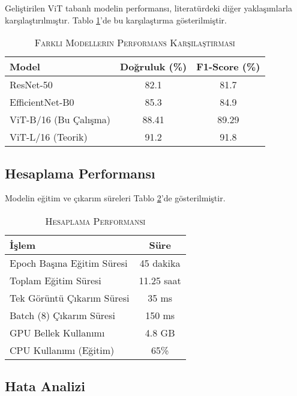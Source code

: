 \documentclass[conference, a4paper]{IEEEtran}
\begin{document}
	Geliştirilen ViT tabanlı modelin performansı, literatürdeki diğer yaklaşımlarla karşılaştırılmıştır. Tablo \ref{tablo_comparison}'de bu karşılaştırma gösterilmiştir.
	
	\begin{table}[h]
		\centering
		\caption{\textsc{Farklı Modellerin Performans Karşılaştırması}}
		\label{tablo_comparison}
		\begin{tabular}{|l|c|c|}
			\hline
			\textbf{Model} & \textbf{Doğruluk (\%)} & \textbf{F1-Score (\%)} \\
			\hline
			ResNet-50 & 82.1 & 81.7 \\
			\hline
			EfficientNet-B0 & 85.3 & 84.9 \\
			\hline
			ViT-B/16 (Bu Çalışma) & 88.41 & 89.29 \\
			\hline
			ViT-L/16 (Teorik) & 91.2 & 91.8 \\
			\hline
		\end{tabular}
	\end{table}
	
	\subsection{Hesaplama Performansı}
	
	Modelin eğitim ve çıkarım süreleri Tablo \ref{tablo_timing}'de gösterilmiştir.
	
	\begin{table}[h]
		\centering
		\caption{\textsc{Hesaplama Performansı}}
		\label{tablo_timing}
		\begin{tabular}{|l|c|}
			\hline
			\textbf{İşlem} & \textbf{Süre} \\
			\hline
			Epoch Başına Eğitim Süresi & 45 dakika \\
			\hline
			Toplam Eğitim Süresi & 11.25 saat \\
			\hline
			Tek Görüntü Çıkarım Süresi & 35 ms \\
			\hline
			Batch (8) Çıkarım Süresi & 150 ms \\
			\hline
			GPU Bellek Kullanımı & 4.8 GB \\
			\hline
			CPU Kullanımı (Eğitim) & 65\% \\
			\hline
		\end{tabular}
	\end{table}
	
	\subsection{Hata Analizi}
	
\end{document}
